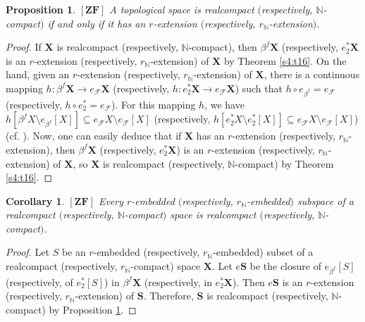 \documentclass[12pt,twoside,leqno]{article}
\theoremstyle{plain}
\newtheorem{proposition}[theorem]{Proposition}
\newtheorem{corollary}[theorem]{Corollary}
\theoremstyle{definition}
\theoremstyle{remark}
\begin{document}
\begin{proposition} 
	\label{s7:p3}
	$[\mathbf{ZF}]$ A topological space is realcompact $($respectively, $\mathbb{N}$-compact$)$ if and only if it has an $r$-extension $($respectively, $r_{\mathbb{N}}$-extension$)$.
\end{proposition}
\begin{proof}
	If $\mathbf{X}$ is realcompact (respectively, $\mathbb{N}$-compact), then $\beta^f\mathbf{X}$ (respectively, $e^{\ast}_{2}\mathbf{X}$ is an $r$-extension (respectively, $r_{\mathbb{N}}$-extension) of $\mathbf{X}$ by Theorem \ref{s4:t16}. On the hand, given an $r$-extension (respectively, $r_{\mathbb{N}}$-extension) of $\mathbf{X}$, there is a continuous mapping $h: \beta^f\mathbf{X}\to e_{\mathcal{F}}\mathbf{X}$ (respectively, $h: e^{\ast}_{2}\mathbf{X}\to e_{\mathcal{F}}\mathbf{X}$) such that $h\circ e_{\beta^f}=e_{\mathcal{F}}$ (respectively, $h\circ e^{\ast}_{2}=e_{\mathcal{F}}$). For this mapping $h$, we have $h[\beta^{f}X\setminus e_{\beta^f}[X]]\subseteq e_{\mathcal{F}}X\setminus e_{\mathcal{F}}[X]$ (respectively, $h[e_{2}^{\ast}X\setminus e_{2}^{\ast}[X]]\subseteq e_{\mathcal{F}}X\setminus e_{\mathcal{F}}[X]$) (cf. \cite[Lemma 3.5.6]{en}). Now, one can easily deduce that if $\mathbf{X}$ has an $r$-extension (respectively, $r_{\mathbb{N}}$-extension), then $\beta^f\mathbf{X}$ (respectively, $e^{\ast}_{2}\mathbf{X}$) is an $r$-extension (respectively, $r_{\mathbb{N}}$-extension) of $\mathbf{X}$, so $\mathbf{X}$ is realcompact (respectively, $\mathbb{N}$-compact) by Theorem \ref{s4:t16}.
\end{proof}

\begin{corollary}
	\label{s7:c4}
	$[\mathbf{ZF}]$ Every $r$-embedded $($respectively, $r_{\mathbb{N}}$-embedded$)$ subspace of a realcompact $($respectively, $\mathbb{N}$-compact$)$ space is realcompact $($respectively, $\mathbb{N}$-compact$)$.
\end{corollary}

\begin{proof}
	Let $S$ be an $r$-embedded (respectively, $r_{\mathbb{N}}$-embedded) subset of a realcompact (respectively, $r_{\mathbb{N}}$-compact) space $\mathbf{X}$. Let $e\mathbf{S}$ be the closure of $e_{\beta^f}[S]$ (respectively, of $e^{\ast}_{2}[S]$) in $\beta^f\mathbf{X}$ (respectively, in $e^{\ast}_{2}\mathbf{X}$). Then $e\mathbf{S}$ is an $r$-extension (respectively, $r_{\mathbb{N}}$-extension) of $\mathbf{S}$. Therefore, $\mathbf{S}$ is realcompact (respectively, $\mathbb{N}$-compact) by Proposition \ref{s7:p3}.
\end{proof}
\end{document}
